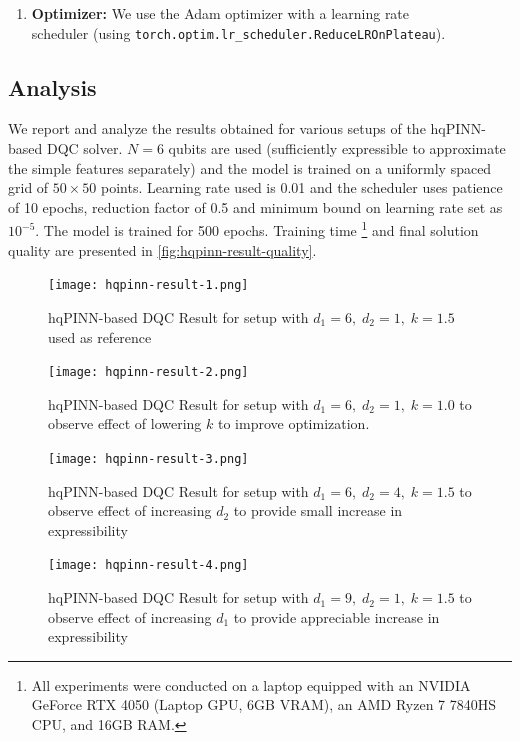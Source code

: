 \documentclass[11pt,a4paper]{article}
\begin{document}
{\begin{enumerate}
    \item \textbf{Optimizer:} We use the Adam optimizer with a learning rate \\ scheduler (using \texttt{torch.optim.lr\_scheduler.ReduceLROnPlateau}).
    
\end{enumerate}

\subsection{Analysis}
We report and analyze the results obtained for various setups of the hqPINN-based DQC solver. $N=6$ qubits are used (sufficiently expressible to approximate the simple features separately) and the model is trained on a uniformly spaced grid of $50 \times 50$ points. Learning rate used is 0.01 and the scheduler uses patience of 10 epochs, reduction factor of 0.5 and minimum bound on learning rate set as $10^{-5}$. The model is trained for 500 epochs. Training time \footnote{All experiments were conducted on a laptop equipped with an NVIDIA GeForce RTX 4050 (Laptop GPU, 6GB VRAM), an AMD Ryzen 7 7840HS CPU, and 16GB RAM.} and final solution quality are presented in \ref{fig:hqpinn-result-quality}.

\begin{figure}[H]
    \centering
    \texttt{[image: hqpinn-result-1.png]}
    \caption{\justifying hqPINN-based DQC Result for setup with $d_1=6,\; d_2=1,\; k = 1.5$ used as reference}
    \label{fig:hqpinn-result-1}
\end{figure}
\begin{figure}[H]
    \centering
    \texttt{[image: hqpinn-result-2.png]}
    \caption{\justifying hqPINN-based DQC Result for setup with $d_1=6,\; d_2=1,\; k = 1.0$ to observe effect of lowering $k$ to improve optimization.}
    \label{fig:hqpinn-result-2}
\end{figure}
\begin{figure}[H]
    \centering
    \texttt{[image: hqpinn-result-3.png]}
    \caption{\justifying hqPINN-based DQC Result for setup with $d_1=6,\; d_2=4,\; k = 1.5$ to observe effect of increasing $d_2$ to provide small increase in expressibility}
    \label{fig:hqpinn-result-3}
\end{figure}
\begin{figure}[H]
    \centering
    \texttt{[image: hqpinn-result-4.png]}
    \caption{\justifying hqPINN-based DQC Result for setup with $d_1=9,\; d_2=1,\; k = 1.5$ to observe effect of increasing $d_1$ to provide appreciable increase in expressibility}
    \label{fig:hqpinn-result-4}
\end{figure}

}
\end{document}
